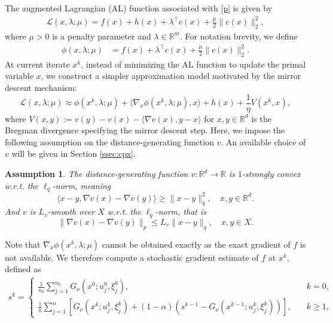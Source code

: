 \documentclass[11pt]{article}
\newtheorem{assumption}{Assumption}[section]
\numberwithin{equation}{section}
\newcommand{\R}{\mathbb{R}}
\newcommand{\be}{\begin{equation}}
\newcommand{\ee}{\end{equation}}
\begin{document}
The augmented Lagrangian (AL) function associated with \eqref{p} is given by 
\begin{equation*}
\begin{aligned}
    \mathcal{L}(x,\lambda;\mu) = f(x) +  h(x) + \lambda^\top c(x) + \frac{\mu}{2} \|c(x)\|_2^2,
\end{aligned} \end{equation*}
where 
$\mu>0$ is a penalty parameter and $\lambda \in \R^m$. 
For notation brevity, we define 
\begin{align*}
\phi(x,\lambda;\mu)&=f(x) + \lambda^\top c(x) + \frac{\mu}{2} \|c(x)\|_2^2.
\end{align*} 
At current iterate \(x^k\), instead of minimizing the AL function to update the primal variable \(x\), we construct a simpler approximation model motivated by the mirror descent mechanism:
\[ \mathcal L(x,\lambda; \mu)\approx \phi(x^k,\lambda;\mu) + \langle \nabla_x \phi(x^k,\lambda;\mu),x \rangle +  h(x) + \frac{1}{\eta}V(x^k,x),
\]
where $V(x,y) := v(y) - v(x) -\langle \nabla v(x) , y-x \rangle$ for $x,y\in \R^d$ is the Bregman divergence specifying the mirror descent step. Here, we impose the following assumption on the distance-generating function $v$. An available choice of $v$ will be given in Section \ref{ssec:cpx}.
\begin{assumption}\label{ass:v}
    The distance-generating function $v: \mathbb{R}^d \to \mathbb{R}$ is $1$-strongly convex   w.r.t. the \(\ell_q\)-norm, meaning 
\be\label{v_str_cvx}
\langle x - y, \nabla v(x) - \nabla v(y) \rangle \geq \|x - y\|_q^2, \quad  x,y\in \mathbb R^d.
\ee
And $v$ is $L_v$-smooth over $X$ w.r.t. the $\ell_q$-norm, that is
\be\label{v_Lv_sm}
\|\nabla v(x)-\nabla v(y)\|_p
    \le L_v\|x-y\|_q,\quad  x,y \in X. 
\ee
\end{assumption}
Note that  $\nabla_x\phi(x^k,\lambda; \mu)$ cannot be obtained exactly as the exact gradient of $f$ is not available. We therefore compute a stochastic gradient estimate of $f$ at $x^k$, defined as
\begin{align}\label{hsgd}
            s^k = \begin{cases}
            \frac{1}{n_0}\sum_{j=1}^{n_0}G_\nu(x^0;u_j^0,\xi_j^0), & k=0,\\
            \frac{1}{n}\sum_{j=1}^n [G_\nu(x^k;u_j^k,\xi_j^k) + (1-\alpha)( s^{k-1} - G_\nu(x^{k-1};u_j^k,\xi_j^k))], \quad & k\ge 1,
            \end{cases}
\end{align}
\end{document}
